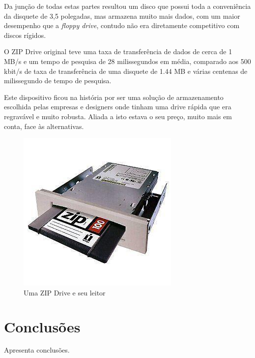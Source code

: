 \documentclass{report}
\begin{document}
	Da junção de todas estas partes resultou um disco que possui toda a conveniência da disquete de 3,5 polegadas, mas armazena muito mais dados, com um maior desempenho que a \textit{floppy drive}, contudo não era diretamente competitivo com discos rígidos.
\vspace{1mm}
	
	O ZIP Drive original teve uma taxa de transferência de dados de cerca de 1 MB/s e um tempo de pesquisa de 28 milissegundos em média, comparado aos 500 kbit/s de taxa de transferência de uma disquete de 1.44 MB e várias centenas de milissegundo de tempo de pesquisa.
\vspace{1mm}

	Este dispositivo ficou na história por ser uma solução de armazenamento escolhida pelas empresas e designers onde tinham uma drive rápida que era regravável e muito robusta. Aliada a isto estava o seu preço, muito mais em conta, face às alternativas.
\vspace{1mm}
	
	\begin{figure} [h]
		\centering
		\includegraphics[scale=0.5]{zipdrive.jpg}
		\caption{Uma ZIP Drive e seu leitor}
	\end{figure}
	
	

\chapter{Conclusões}
\label{chap.conclusao}
Apresenta conclusões.
\end{document}
